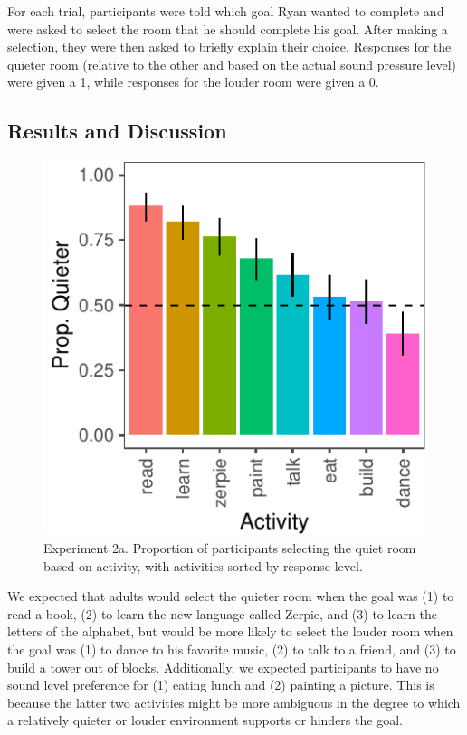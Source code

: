 \documentclass[10pt, letterpaper]{article}
\newenvironment{CodeChunk}{}{}
\begin{document}
For each trial, participants were told which goal Ryan wanted to
complete and were asked to select the room that he should complete his
goal. After making a selection, they were then asked to briefly explain
their choice. Responses for the quieter room (relative to the other and
based on the actual sound pressure level) were given a 1, while
responses for the louder room were given a 0.

\hypertarget{results-and-discussion-2}{%
\subsection{Results and Discussion}\label{results-and-discussion-2}}

\begin{CodeChunk}
\begin{figure}[t]

{\centering \includegraphics{figs/e2a-bar-1} 

}

\caption[Experiment 2a]{Experiment 2a. Proportion of participants selecting the quiet room based on activity, with activities sorted by response level.}\label{fig:e2a-bar}
\end{figure}
\end{CodeChunk}

We expected that adults would select the quieter room when the goal was
(1) to read a book, (2) to learn the new language called Zerpie, and (3)
to learn the letters of the alphabet, but would be more likely to select
the louder room when the goal was (1) to dance to his favorite music,
(2) to talk to a friend, and (3) to build a tower out of blocks.
Additionally, we expected participants to have no sound level preference
for (1) eating lunch and (2) painting a picture. This is because the
latter two activities might be more ambiguous in the degree to which a
relatively quieter or louder environment supports or hinders the goal.
\end{document}
